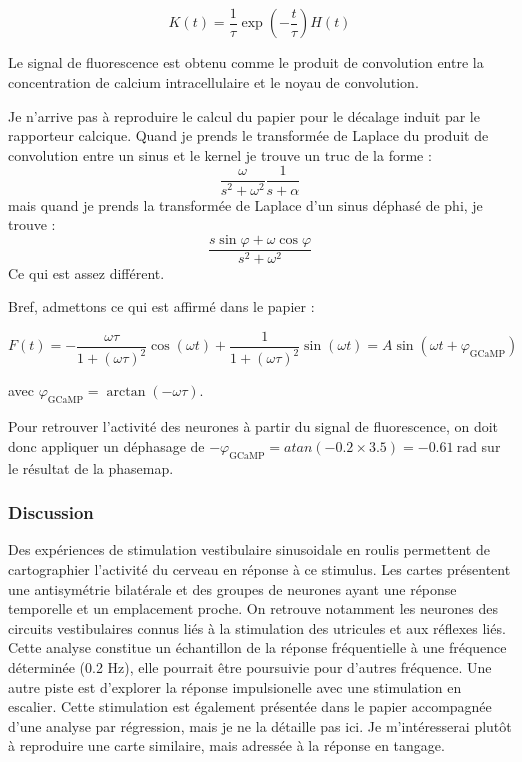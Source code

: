 $$
K(t) = \frac{1}{\tau}\exp\left(-\frac{t}{\tau}\right)H(t)
$$

Le signal de fluorescence est obtenu comme le produit de convolution entre la concentration de calcium intracellulaire et le noyau de convolution. 


Je n'arrive pas à reproduire le calcul du papier pour le décalage induit par le rapporteur calcique. Quand je prends le transformée de Laplace du produit de convolution entre un sinus et le kernel je trouve un truc de la forme : 
$$ \frac{\omega}{s^2+\omega^2} \frac{1}{s+\alpha} $$
mais quand je prends la transformée de Laplace d'un sinus déphasé de phi, je trouve : 
$$ \frac{s\sin\varphi+\omega\cos\varphi}{s^2+\omega^2} $$
Ce qui est assez différent.

Bref, admettons ce qui est affirmé dans le papier :

$$
F(t) = -\frac{\omega\tau}{1+(\omega\tau)^2}\cos(\omega t) + \frac{1}{1+(\omega\tau)^2}\sin(\omega t) = A\sin(\omega t + \varphi_\text{GCaMP})
$$

avec $\varphi_\text{GCaMP} = \arctan(-\omega\tau)$.

Pour retrouver l'activité des neurones à partir du signal de fluorescence, on doit donc appliquer un déphasage de $ -\varphi_\text{GCaMP} = atan(-0.2 \times 3.5) = -0.61\ \mathrm{rad}$ sur le résultat de la phasemap.


\subsubsection{Discussion}

Des expériences de stimulation vestibulaire sinusoidale en roulis permettent de cartographier l'activité du cerveau en réponse à ce stimulus. Les cartes présentent une antisymétrie bilatérale et des groupes de neurones ayant une réponse temporelle et un emplacement proche. On retrouve notamment les neurones des circuits vestibulaires connus liés à la stimulation des utricules et aux réflexes liés. Cette analyse constitue un échantillon de la réponse fréquentielle à une fréquence déterminée (0.2 Hz), elle pourrait être poursuivie pour d'autres fréquence. Une autre piste est d'explorer la réponse impulsionelle avec une stimulation en escalier. Cette stimulation est également présentée dans le papier accompagnée d'une analyse par régression, mais je ne la détaille pas ici. Je m'intéresserai plutôt à reproduire une carte similaire, mais adressée à la réponse en tangage.


